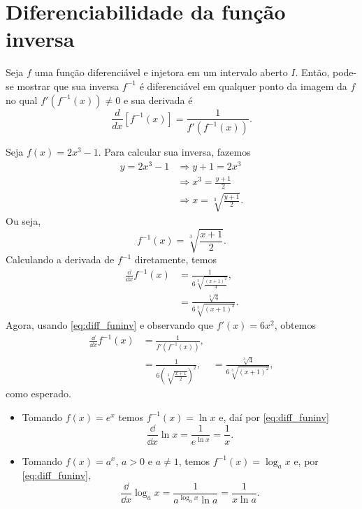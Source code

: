\emconstrucao

\section{Diferenciabilidade da função inversa}\label{cap_deriv_sec_funinv}

Seja $f$ uma função diferenciável e injetora em um intervalo aberto $I$. Então, pode-se mostrar que sua inversa $f^{-1}$ é diferenciável em qualquer ponto da imagem da $f$ no qual $f'(f^{-1}(x))\neq 0$ e sua derivada é
\begin{equation}\label{eq:diff_funinv}
  \frac{d}{dx}[f^{-1}(x)] = \frac{1}{f'(f^{-1}(x))}.
\end{equation}

\begin{ex}
  Seja $f(x) = 2x^3-1$. Para calcular sua inversa, fazemos
  \begin{align}
    y = 2x^3-1 &\Rightarrow y+1 = 2x^3\\
               &\Rightarrow x^3 = \frac{y+1}{2}\\
               &\Rightarrow x = \sqrt[3]{\frac{y+1}{2}}.
  \end{align}
  Ou seja,
  \begin{equation}
    f^{-1}(x) = \sqrt[3]{\frac{x+1}{2}}.
  \end{equation}
  Calculando a derivada de $f^{-1}$ diretamente, temos
  \begin{align}
    \frac{\dd}{\dd x}f^{-1}(x) &= \frac{1}{6\sqrt[3]{\frac{(x+1)^2}{4}}},\\
                          &= \frac{\sqrt[3]{4}}{6\sqrt[3]{(x+1)^2}}.
  \end{align}
  Agora, usando \eqref{eq:diff_funinv} e observando que $f'(x) = 6x^2$, obtemos
  \begin{align}
    \frac{\dd}{\dd x}f^{-1}(x) &= \frac{1}{f'(f^{-1}(x))},\\
                               &= \frac{1}{6\left(\sqrt[3]{\frac{x+1}{2}}\right)^2},
                               &= \frac{\sqrt[3]{4}}{6\sqrt[3]{(x+1)^2}},
  \end{align}
  como esperado.
\end{ex}

\begin{ex}
  \begin{itemize}
  \item Tomando $f(x) = e^x$ temos $f^{-1}(x) = \ln x$ e, daí por \eqref{eq:diff_funinv}
    \begin{equation}
      \frac{\dd }{\dd x}\ln x = \frac{1}{e^{\ln x}} = \frac{1}{x}.
    \end{equation}
  \item Tomando $f(x) = a^x$, $a> 0$ e $a\neq 1$, temos $f^{-1}(x) = \log_a x$ e, por \eqref{eq:diff_funinv},
    \begin{equation}
      \frac{\dd}{\dd x}\log_a x = \frac{1}{a^{\log_a x}\ln a} = \frac{1}{x\ln a}.
    \end{equation}
  \end{itemize}
\end{ex}

